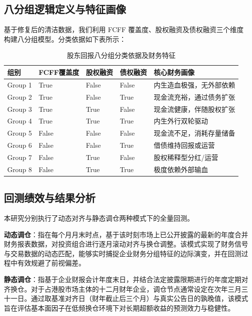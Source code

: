 \documentclass[a4paper,10pt]{article}
\begin{document}
\subsection{八分组逻辑定义与特征画像}

基于修复后的清洁数据，我们利用 FCFF 覆盖度、股权融资及债权融资三个维度构建八分组模型。分类依据如下表所示：

\begin{table}[H]
\centering
\caption{股东回报八分组分类依据及财务特征}
\label{tab:eight_groups}
\small
\begin{tabular}{lp{1.8cm}p{1.8cm}p{1.8cm}p{4.5cm}}
\toprule
组别 & FCFF覆盖度 & 股权融资 & 债权融资 & 核心财务画像 \\
\midrule
Group 1 & True & False & False & 内生造血极强，无外部依赖 \\
Group 2 & True & False & True & 现金流充裕，通过债务扩张 \\
Group 3 & True & True & False & 现金流健康，伴随股权扩张 \\
Group 4 & True & True & True & 内生外行双轮驱动 \\
Group 5 & False & False & False & 现金流不足，消耗存量储备 \\
Group 6 & False & False & True & 借债维持回报或运营 \\
Group 7 & False & True & False & 股权稀释型分红/运营 \\
Group 8 & False & True & True & 极度依赖外部输血 \\
\bottomrule
\end{tabular}
\end{table}

\subsection{回测绩效与结果分析}

本研究分别执行了动态对齐与静态调仓两种模式下的全量回测。

\textbf{动态调仓}：指在每个月月末时点，基于该时刻市场上已公开披露的最新的年度合并财务报表数据，对投资组合进行逐月滚动对齐与换仓调整。该模式实现了财务信号与交易数据的动态匹配，能够实时捕捉企业财务分组特征的边际演变，并在回测过程中有效规避了前视偏差。

\textbf{静态调仓}：指基于企业财报会计年度末日，并结合法定披露限期进行的年度定期对齐换仓。对于占港股市场主体的十二月财年企业，调仓节点通常设定在次年三月三十一日。通过取基准对齐日（财年截止后三个月）与真实公告日的孰晚值，该模式旨在评估基本面因子在低频换仓环境下对长期超额收益的预测效力与稳健性。
\end{document}
